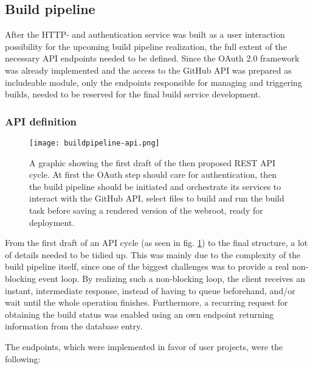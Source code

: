 \subsection{Build pipeline}
\label{sec:structure-buildpipeline}
After the HTTP- and authentication service was built as a user interaction possibility for the upcoming build pipeline realization, the full extent of the necessary API endpoints needed to be defined. Since the OAuth 2.0 framework was already implemented and the access to the GitHub API was prepared as includeable module, only the endpoints responsible for managing and triggering builds, needed to be reserved for the final build service development.

\subsubsection{API definition}

\begin{figure} %
    \centering
    \texttt{[image: buildpipeline-api.png]}
    \caption{A graphic showing the first draft of the then proposed REST API cycle. At first the OAuth step should care for authentication, then the build pipeline should be initiated and orchestrate its services to interact with the GitHub API, select files to build and run the build task before saving a rendered version of the webroot, ready for deployment.}
    \label{fig:buildpipeline-api}
\end{figure}
%

From the first draft of an API cycle (as seen in fig. \ref{fig:buildpipeline-api}) to the final structure, a lot of details needed to be tidied up. This was mainly due to the complexity of the build pipeline itself, since one of the biggest challenges was to provide a real non-blocking event loop. By realizing such a non-blocking loop, the client receives an instant, intermediate response, instead of having to queue beforehand, and/or wait until the whole operation finishes. Furthermore, a recurring request for obtaining the build status was enabled using an own endpoint returning information from the database entry.

The endpoints, which were implemented in favor of user projects, were the following:

